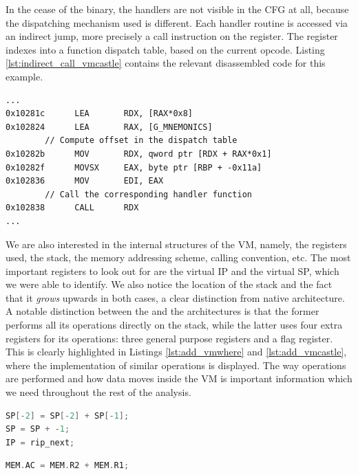 In the cease of the  binary, the handlers are not visible in the \gls{CFG} at all, because the dispatching mechanism used is different. Each handler routine is accessed via an indirect jump, more precisely a call instruction on the  register. The  register indexes into a function dispatch table, based on the current opcode. Listing \ref{lst:indirect_call_vmcastle} contains the relevant disassembled code for this example.

\begin{lstlisting}[label={lst:indirect_call_vmcastle}, caption={x86\_64 disassembly of the \cc{vmcastle} dispatcher. The function handler corresponding to the current opcode is indirectly called through the register \cc{RDX}.}]
...
0x10281c      LEA       RDX, [RAX*0x8]
0x102824      LEA       RAX, [G_MNEMONICS]
        // Compute offset in the dispatch table
0x10282b      MOV       RDX, qword ptr [RDX + RAX*0x1] 
0x10282f      MOVSX     EAX, byte ptr [RBP + -0x11a]
0x102836      MOV       EDI, EAX
        // Call the corresponding handler function
0x102838      CALL      RDX  
...
\end{lstlisting}

We are also interested in the internal structures of the \gls{VM}, namely, the registers used, the stack, the memory addressing scheme, calling convention, etc. The most important registers to look out for are the virtual \gls{IP} and the virtual \gls{SP}, which we were able to identify. We also notice the location of the stack and the fact that it \emph{grows} upwards in both cases, a clear distinction from native  architecture. A notable distinction between the  and the  architectures is that the former performs all its operations directly on the stack, while the latter uses four extra registers for its operations: three general purpose registers and a flag register. This is clearly highlighted in Listings \ref{lst:add_vmwhere} and \ref{lst:add_vmcastle}, where the implementation of similar  operations is displayed. The way operations are performed and how data moves inside the \gls{VM} is important information which we need throughout the rest of the analysis.

\begin{multicols}{2}
    \begin{lstlisting}[language=c, label={lst:add_vmwhere}, caption={Stack-based implementation of a simple \cc{add} instruction in the \cc{vmwhere} architecture.}]
SP[-2] = SP[-2] + SP[-1];
SP = SP + -1;
IP = rip_next;
\end{lstlisting}
\columnbreak
\begin{lstlisting}[language=c, label={lst:add_vmcastle}, caption={Register-based implementation of a simple \cc{add} instruction in the \cc{vmcastle} architecture.}]
MEM.AC = MEM.R2 + MEM.R1;
\end{lstlisting}
\end{multicols}


